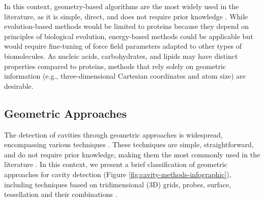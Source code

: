 \documentclass[Ingles]{phdthesis}
\begin{document}
In this context, geometry-based algorithms are the most widely used in the literature, as it is simple, direct, and does not require prior knowledge \cite{henrich2010,oliveira2014}. While evolution-based methods would be limited to proteins because they depend on principles of biological evolution, energy-based methods could be applicable but would require fine-tuning of force field parameters adapted to other types of biomolecules. As nucleic acids, carbohydrates, and lipids may have distinct properties compared to proteins, methods that rely solely on geometric information (e.g., three-dimensional Cartesian coordinates and atom size) are desirable.


\subsection{Geometric Approaches \label{sec:geometric-approaches}}

The detection of cavities through geometric approaches is widespread, encompassing various techniques \cite{simoes2017,guerra2020}. These techniques are simple, straightforward, and do not require prior knowledge, making them the most commonly used in the literature \cite{henrich2010,oliveira2014}. In this context, we present a brief classification of geometric approaches for cavity detection (Figure \ref{fig:cavity-methods-infographic}), including techniques based on tridimensional (3D) grids, probes, surface, tessellation and their combinations \cite{simoes2017,guerra2020,guerra2023B}.
\end{document}

